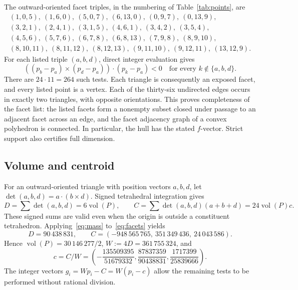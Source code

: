 \documentclass[11pt]{amsart}
\theoremstyle{remark}
\newcommand{\vol}{\operatorname{vol}}
\begin{document}
The outward-oriented facet triples, in the numbering of Table~\ref{tab:points}, are
\begin{equation}\label{eq:facets}
\begin{gathered}
(1,0,5),\ (1,6,0),\ (5,0,7),\ (6,13,0),\ (0,9,7),\ (0,13,9),\\
(3,2,1),\ (2,4,1),\ (3,1,5),\ (4,6,1),\ (3,4,2),\ (3,5,4),\\
(4,5,6),\ (5,7,6),\ (6,7,8),\ (6,8,13),\ (7,9,8),\ (8,9,10),\\
(8,10,11),\ (8,11,12),\ (8,12,13),\ (9,11,10),\ (9,12,11),\ (13,12,9).
\end{gathered}
\end{equation}
For each listed triple $(a,b,d)$, direct integer evaluation gives
\begin{equation}\label{eq:support}
 ((p_b-p_a)\times(p_d-p_a))\cdot(p_k-p_a)<0
 \quad\text{for every }k\notin\{a,b,d\}.
\end{equation}
There are $24\cdot11=264$ such tests. Each triangle is consequently an exposed facet, and every listed point is a vertex. Each of the thirty-six undirected edges occurs in exactly two triangles, with opposite orientations. This proves completeness of the facet list: the listed facets form a nonempty subset closed under passage to an adjacent facet across an edge, and the facet adjacency graph of a convex polyhedron is connected. In particular, the hull has the stated $f$-vector. Strict support also certifies full dimension.

\subsection{Volume and centroid}
For an outward-oriented triangle with position vectors $a,b,d$, let $\det(a,b,d)=a\cdot(b\times d)$. Signed tetrahedral integration gives
\begin{equation}\label{eq:mass}
 D=\sum\det(a,b,d)=6\vol(P),\qquad
 C=\sum\det(a,b,d)(a+b+d)=24\vol(P)c.
\end{equation}
These signed sums are valid even when the origin is outside a constituent tetrahedron. Applying~\eqref{eq:mass} to~\eqref{eq:facets} yields
\[
 D=90\,438\,831,\qquad
 C=(-948\,565\,765,\ 351\,349\,436,\ 24\,043\,586).
\]
Hence $\vol(P)=30\,146\,277/2$, $W:=4D=361\,755\,324$, and
\begin{equation}\label{eq:centroid}
 c=C/W
 =\left(-\frac{135509395}{51679332},
          \frac{87837359}{90438831},
          \frac{1717399}{25839666}\right).
\end{equation}
The integer vectors $g_i=Wp_i-C=W(p_i-c)$ allow the remaining tests to be performed without rational division.
\end{document}
